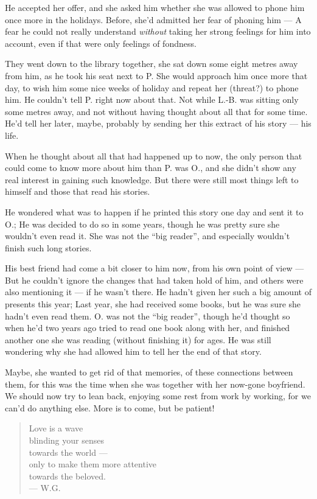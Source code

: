 He accepted her offer, and she asked him whether she was allowed to phone him once more in the holidays. Before, she'd admitted her fear of phoning him --- A fear he could not really understand \emph{without} taking her strong feelings for him into account, even if that were only feelings of fondness.

They went down to the library together, she sat down some eight metres away from him, as he took his seat next to P. 
She would approach him once more that day, to wish him some nice weeks of holiday and repeat her (threat?) to phone him. 
He couldn't tell P. right now about that. Not while L.-B. was sitting only some metres away, and not without having thought about all that for some time. 
He'd tell her later, maybe, probably by sending her this extract of his story --- his life.

When he thought about all that had happened up to now, the only person that could come to know more about him than P. was O., and she didn't show any real interest in gaining such knowledge. But there were still most things left to himself and those that read his stories.

He wondered what was to happen if he printed this story one day and sent it to O.; He was decided to do so in some years, though he was pretty sure she wouldn't even read it. She was not the \enquote{big reader}, and especially wouldn't finish such long stories.

His best friend had come a bit closer to him now, from his own point of view --- But he couldn't ignore the changes that had taken hold of him, and others were also mentioning it --- if he wasn't there. 
He hadn't given her such a big amount of presents this year; Last year, she had received some books, but he was sure she hadn't even read them. O. was not the \enquote{big reader}, though he'd thought so when he'd two years ago tried to read one book along with her, and finished another one she was reading (without finishing it) for ages. He was still wondering why she had allowed him to tell her the end of that story.

Maybe, she wanted to get rid of that memories, of these connections between them, for this was the time when she was together with her now-gone boyfriend. 
We should now try to lean back, enjoying some rest from work by working, for we can'd do anything else. More is to come, but be patient! 

\begin{verse}
Love is a wave \\
blinding your senses \\
towards the world --- \\
only to make them more attentive \\
towards the beloved. \\
--- W.G.
\end{verse}

